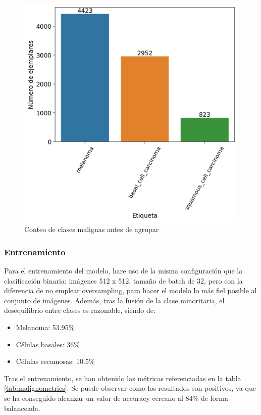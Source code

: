 \begin{figure}[H]
	\centering
	\includegraphics[scale = 0.6]{imagenes/countmalignant.png}
	\caption{Conteo de clases malignas antes de agrupar}
	\label {fig:malas}
\end{figure}

\subsubsection{Entrenamiento}

Para el entrenamiento del modelo, hare uso de la misma configuración que la clasificación binaria: imágenes 512 x 512, tamaño de batch de 32, pero con la diferencia de no emplear oversampling, para hacer el modelo lo más fiel posible al conjunto de imágenes. Además, tras la fusión de la clase minoritaria, el desequilibrio entre clases es razonable, siendo de:

\begin{itemize}
	\item Melanoma: 53.95\%
	\item Células basales: 36\%
	\item Células escamosas: 10.5\%
 \end{itemize}
 
 Tras el entrenamiento, se han obtenido las métricas referenciadas en la tabla \ref{tab:malignometrics}. Se puede observar como los resultados son positivos, ya que se ha conseguido alcanzar un valor de accuracy cercano al 84\% de forma balanceada.  
 
